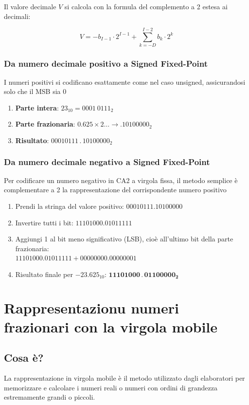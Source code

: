 Il valore decimale $V$ si calcola con la formula del complemento a 2 estesa ai decimali:

{
    \LARGE
    $$
    \displaystyle V = -b_{I-1} \cdot 2^{I-1} + \sum_{k=-D}^{I-2} b_k \cdot 2^k
    $$
}

\subsection{Da numero decimale positivo a Signed Fixed-Point}
I numeri positivi si codificano esattamente come nel caso unsigned, assicurandosi solo che il MSB sia 0

\begin{enumerate}
    \item \textbf{Parte intera}: $23_{10} = 0001\ 0111_{2}$
    \item \textbf{Parte frazionaria}: $0.625 \times 2 \dots \rightarrow .10100000_2$
    \item \textbf{Risultato}: ${00010111\,.\,10100000}_2$
\end{enumerate}

\newpage
\subsection{Da numero decimale negativo a Signed Fixed-Point}
Per codificare un numero negativo in CA2 a virgola fissa, il metodo semplice è complementare a 2 la rappresentazione del corrispondente numero positivo

\begin{enumerate}
    \item Prendi la stringa del valore positivo: $00010111.10100000$
    \item Invertire tutti i bit: $11101000.01011111$
    \item Aggiungi 1 al bit meno significativo (LSB), cioè all'ultimo bit della parte frazionaria:\\ $11101000.01011111 + 00000000.00000001$
    \item Risultato finale per $-23.625_{10}$: $\mathbf{11101000\,.\,01100000_2}$
\end{enumerate}

\chapter{Rappresentazionu numeri frazionari con la virgola mobile}

\section{Cosa è?}
La rappresentazione in virgola mobile è il metodo utilizzato dagli elaboratori per memorizzare e calcolare i numeri reali o numeri con ordini di grandezza estremamente grandi o piccoli.


